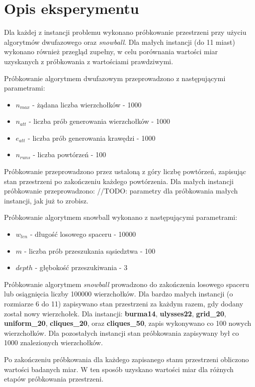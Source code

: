 \section{Opis eksperymentu}

Dla każdej z instancji problemu wykonano próbkowanie przestrzeni przy użyciu algorytmów dwufazowego oraz \textit{snowball}.
Dla małych instancji (do 11 miast) wykonano również przegląd zupełny, w celu porównania wartości miar uzyskanych z próbkowania z wartościami
prawdziwymi.

Próbkowanie algorytmem dwufazowym przeprowadzono z następującymi parametrami:
\begin{itemize}
    \item $n_{max}$ - żądana liczba wierzchołków - 1000
    \item $n_{att}$ - liczba prób generowania wierzchołków - 1000
    \item $e_{att}$ - liczba prób generowania krawędzi - 1000
    \item $n_{runs}$ - liczba powtórzeń - 100
\end{itemize}

Próbkowanie przeprowadzono przez ustaloną z góry liczbę powtórzeń, zapisując stan przestrzeni po zakończeniu każdego powtórzenia.
Dla małych instancji próbkowanie przeprowadzono: //TODO: parametry dla próbkowania małych instancji, jak już to zrobisz.


Próbkowanie algorytmem snowball wykonano z następującymi parametrami:
\begin{itemize}
    \item $w_{len}$ - długość losowego spaceru - 10000
    \item $m$ - liczba prób przeszukania sąsiedztwa - 100
    \item $depth$ - głębokość przeszukiwania - 3
\end{itemize}

Próbkowanie algorytmem \textit{snowball} prowadzono do zakończenia losowego spaceru lub osiągnięcia liczby 100000 wierzchołków.
Dla bardzo małych instancji (o rozmiarze 6 do 11) zapisywano stan przestrzeni za każdym razem, gdy dodany został nowy wierzchołek.
Dla instancji: \textbf{burma14}, \textbf{ulysses22}, \textbf{grid\_20}, \textbf{uniform\_20}, \textbf{cliques\_20}, oraz \textbf{cliques\_50},
zapis wykonywano co 100 nowych wierzchołków.
Dla pozostałych instancji stan próbkowania zapisywany był co 1000 znalezionych wierzchołków.

Po zakończeniu próbkowania dla każdego zapisanego stanu przestrzeni obliczono wartości badanych miar. W ten sposób uzyskano
wartości miar dla różnych etapów próbkowania przestrzeni.

